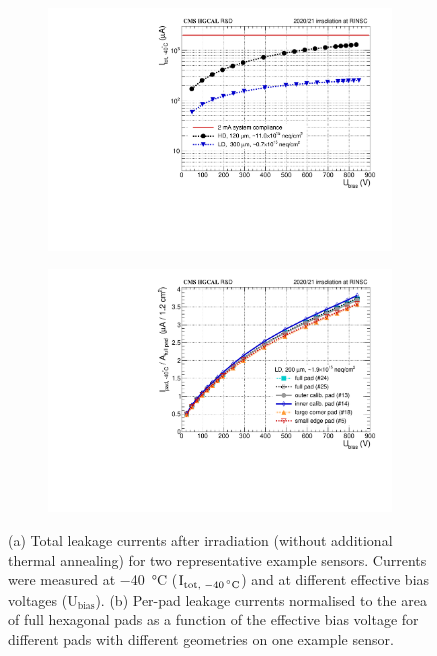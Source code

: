 \begin{figure}
	\captionsetup[subfigure]{aboveskip=-1pt,belowskip=-1pt}
	\centering
	\begin{subfigure}[b]{0.49\textwidth}
		\includegraphics[width=0.999\textwidth]{plots/total_iv/total_current_IV.pdf}
		\subcaption{
		}
		\label{plot:tot_IV_good}
    \end{subfigure}
    \hfill
    \begin{subfigure}[b]{0.49\textwidth}
        \includegraphics[width=0.999\textwidth]{plots/channel_iv/channel_IV_sensors_channels.pdf}
        \subcaption{
        }
        \label{plot:pad_IV_channels}
    \end{subfigure}

	\caption{
		(a) Total leakage currents after irradiation (without additional thermal annealing) for two representative example sensors. 
		Currents were measured at \SI{-40}{\celsius} ($\text{I}_\text{tot, \SI{-40}{\celsius}}$) and at different effective bias voltages ($\text{U}_\text{bias}$). 
        (b) Per-pad leakage currents normalised to the area of full hexagonal pads as a function of the effective bias voltage for different pads with different geometries on one example sensor.
	}
\end{figure}
